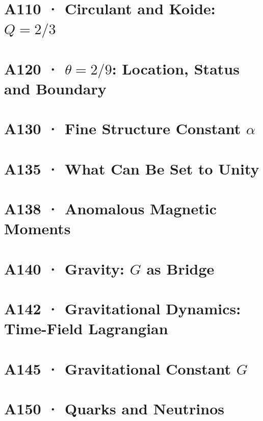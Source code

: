 \documentclass[11pt,twoside,openright]{book}
\begin{document}
\chapter[A110 · Circulant and Koide]{A110 · Circulant and Koide: $Q=2/3$}


\chapter[A120 · $\theta = 2/9$]{A120 · $\theta=2/9$: Location, Status and Boundary}


\chapter[A130 · Fine Structure Constant]{A130 · Fine Structure Constant $\alpha$}


\chapter[A135 · What Can Be Set to Unity]{A135 · What Can Be Set to Unity}


\chapter[A138 · Anomalous Magnetic Moments]{A138 · Anomalous Magnetic Moments}


\chapter[A140 · Gravity: $G$ as Bridge]{A140 · Gravity: $G$ as Bridge}


\chapter[A142 · Gravitational Dynamics]{A142 · Gravitational Dynamics: Time-Field Lagrangian}


\chapter[A145 · Gravitational Constant]{A145 · Gravitational Constant $G$}


\chapter[A150 · Quarks and Neutrinos]{A150 · Quarks and Neutrinos}

\end{document}
